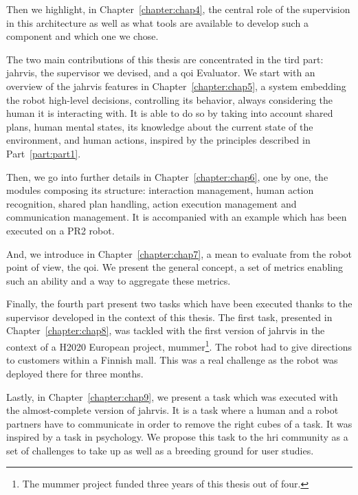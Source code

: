 \documentclass[a4paper,11pt,twoside]{StyleThese}
\begin{document}
Then we highlight, in Chapter~\ref{chapter:chap4}, the central role of the supervision in this architecture as well as what tools are available to develop such a component and which one we chose.

\bigskip

The two main contributions of this thesis are concentrated in the tird part: \acrfull{jahrvis}, the supervisor we devised, and a \acrfull{qoi} Evaluator. We start with an overview of the \acrshort{jahrvis} features in Chapter~\ref{chapter:chap5}, \ie a system embedding the robot high-level decisions, controlling its behavior, always considering the human it is interacting with. It is able to do so by taking into account shared plans, human mental states, its knowledge about the current state of the environment, and human actions, inspired by the principles described in Part~\ref{part:part1}. 

Then, we go into further details in Chapter~\ref{chapter:chap6}, one by one, the modules composing its structure: interaction management, human action recognition, shared plan handling, action execution management and communication management. It is accompanied with an example which has been executed on a PR2 robot. 

And, we introduce in Chapter~\ref{chapter:chap7}, a mean to evaluate from the robot point of view, the \acrlong{qoi}. We present the general concept, a set of metrics enabling such an ability and a way to aggregate these metrics. 

\bigskip

Finally, the fourth part present two tasks which have been executed thanks to the supervisor developed in the context of this thesis. The first task, presented in Chapter~\ref{chapter:chap8}, was tackled with the first version of \acrshort{jahrvis} in the context of a H2020 European project, \acrfull{mummer}\footnote{The \acrshort{mummer} project funded three years of this thesis out of four.}. The robot had to give directions to customers within a Finnish mall. This was a real challenge as the robot was deployed there for three months.

Lastly, in Chapter~\ref{chapter:chap9}, we present a task which was executed with the almost-complete version of \acrshort{jahrvis}. It is a task where a human and a robot partners have to communicate in order to remove the right cubes of a task. It was inspired by a task in psychology. We propose this task to the \acrshort{hri} community as a set of challenges to take up as well as a breeding ground for user studies.
\end{document}
